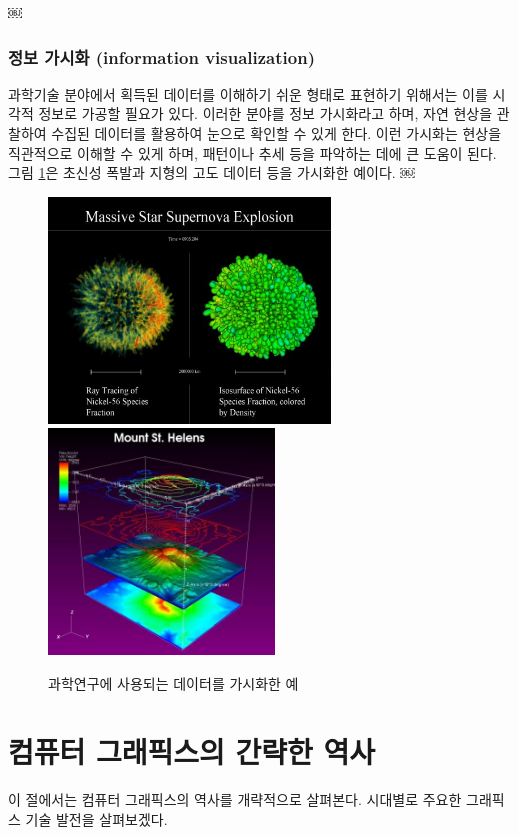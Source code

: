 ￼
\subsubsection{정보 가시화 (information visualization)}

과학기술 분야에서 획득된 데이터를 이해하기 쉬운 형태로 표현하기 위해서는 이를 시각적 정보로 가공할 필요가 있다. 이러한 분야를 정보 가시화라고 하며, 자연 현상을 관찰하여 수집된 데이터를 활용하여 눈으로 확인할 수 있게 한다. 이런 가시화는 현상을 직관적으로 이해할 수 있게 하며, 패턴이나 추세 등을 파악하는 데에 큰 도움이 된다.
그림 \ref{fig:OGL_intro:visualization}은 초신성 폭발과 지형의 고도 데이터 등을 가시화한 예이다.
￼

\begin{figure}[h!]
  \centering
    \includegraphics[height=6cm]{OGL_intro/visualization1.jpg}
    \includegraphics[height=6cm]{OGL_intro/visualization2.jpg}
    \caption{과학연구에 사용되는 데이터를 가시화한 예}
    \label{fig:OGL_intro:visualization}
\end{figure}

\section{컴퓨터 그래픽스의 간략한 역사}

이 절에서는 컴퓨터 그래픽스의 역사를 개략적으로 살펴본다. 시대별로 주요한 그래픽스 기술 발전을 살펴보겠다.

